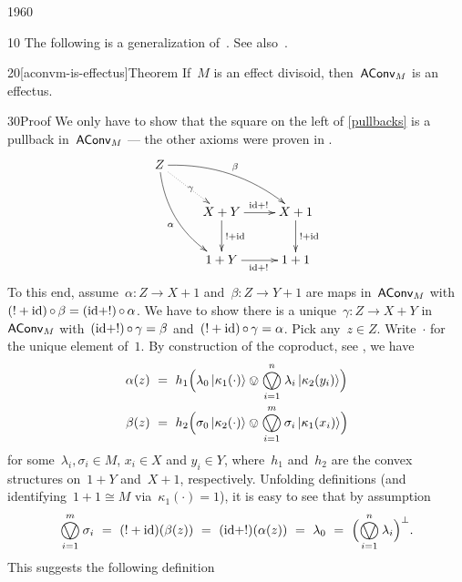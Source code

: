 \begin{parsec}{1960}%
\begin{point}{10}%
The following is a generalization
of~\cite[prop.~C.3]{kentapartial}.
See also~\cite[prop.~15]{statesofconvexsets}.
\end{point}
\begin{point}{20}[aconvm-is-effectus]{Theorem}%
If~$M$ is an effect divisoid,
    then~$\mathsf{AConv}_M$ is an effectus.
\begin{point}{30}{Proof}%
We only have to show that the square on the left
    of \eqref{pullbacks} is a pullback in~$\mathsf{AConv}_M$
    --- the other axioms were proven in .
\begin{equation*}
\xymatrix{
    Z \ar@/^1pc/[rrd]^\beta
        \ar@/_1pc/[rdd]_\alpha
        \ar@{.>}[rd]|\gamma\\
        &X+Y \ar[r]^{\id+!} \ar[d]^{!+\id} & X+1\ar[d]^{!+\id} \\
        &1+Y\ar[r]_{\id+!} & 1+1
    }
\end{equation*}
To this end, assume~$\alpha\colon Z \to X+1$
and~$\beta\colon Z \to Y+1$
are maps in~$\mathsf{AConv}_M$
with~$(! + \mathrm{id}) \mathop{\circ} \beta = (\mathrm{id}+!)\mathop{\circ} \alpha$.
We have to show there is a unique~$\gamma\colon Z \to X+Y$ in~$\mathsf{AConv}_M$
with~$(\mathrm{id}+!)\mathop{\circ} \gamma =\beta$
and~$(!+\mathrm{id}) \mathop{\circ} \gamma =\alpha$.
Pick any~$z \in Z$.
Write~$\cdot$ for the unique element of~$1$.
By construction of the coproduct, see ,
we have
\begin{align*}
    \alpha(z) &\ =\  h_1\Bigl(\lambda_0 \ket{\kappa_1(\cdot)}
    \ovee \bigovee^n_{i=1} \lambda_i \ket{\kappa_2(y_i)}\Bigr) \\
        \beta(z) &\ =\  h_2 \Bigl(\sigma_0 \ket{\kappa_2(\cdot)}
        \ovee \bigovee^m_{i=1} \sigma_i \ket{\kappa_1(x_i)}\Bigr)
\end{align*}
for some~$\lambda_i, \sigma_i \in M$,
    $x_i \in X$ and $y_i \in Y$,
    where~$h_1$ and~$h_2$ are the convex structures
    on~$1+Y$ and~$X+1$, respectively.
Unfolding definitions
    (and identifying~$1+1 \cong M$ via~$\kappa_1 (\cdot) = 1$),
    it is easy to
    see that by assumption
\begin{equation}\label{aconv-epb-ass}
    \bigovee^m_{i=1} \sigma_i \ = \ 
    (!+\id)(\beta(z))  \ = \ 
    (\id + !)(\alpha(z)) \ =\  \lambda_0
    \ = \ \Bigl(\bigovee^n_{i=1} \lambda_i\Bigr)^\perp.
\end{equation}
This suggests the following definition
\begin{equation}\label{aconvmexpuldefgamma}

\end{equation}
\end{point}
\end{point}
\end{parsec}
